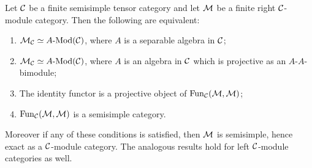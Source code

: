 \documentclass{amsart}
\begin{document}
\begin{theorem} \label{thm:SepModCats}
	Let $\mathcal C$ be a finite semisimple tensor category and let $\mathcal M$ be a finite right $\mathcal C$-module category. Then the following are equivalent:
	\begin{enumerate}
		\item $\cM_\cC \simeq \Mod{A}{}(\cC)$, where $A$ is a separable algebra in $\mathcal C$;
		\item $\cM_\cC \simeq \Mod{A}{}(\cC)$, where $A$ is an algebra in $\mathcal C$ which is projective as an $A$-$A$-bimodule;
		\item The identity functor is a projective object of $\operatorname{Fun}_\mathcal C(\mathcal M, \mathcal M)$;
		\item $\operatorname{Fun}_\mathcal C(\mathcal M, \mathcal M)$ is a semisimple category. 
	\end{enumerate}
	Moreover if any of these conditions is satisfied, then $\mathcal M$ is semisimple, hence exact as a $\mathcal C$-module category. The analogous results hold for left $\mathcal C$-module categories as well. 
\end{theorem}
\end{document}
